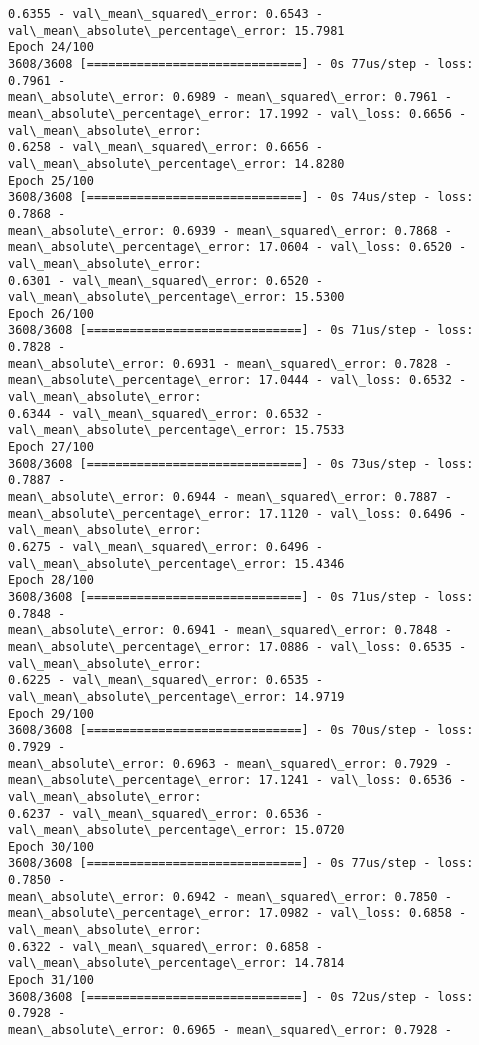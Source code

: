 \documentclass[11pt]{article}
\begin{document}
\begin{Verbatim}[commandchars=\\\{\},fontsize=\footnotesize]
0.6355 - val\_mean\_squared\_error: 0.6543 - val\_mean\_absolute\_percentage\_error: 15.7981
Epoch 24/100
3608/3608 [==============================] - 0s 77us/step - loss: 0.7961 -
mean\_absolute\_error: 0.6989 - mean\_squared\_error: 0.7961 -
mean\_absolute\_percentage\_error: 17.1992 - val\_loss: 0.6656 - val\_mean\_absolute\_error:
0.6258 - val\_mean\_squared\_error: 0.6656 - val\_mean\_absolute\_percentage\_error: 14.8280
Epoch 25/100
3608/3608 [==============================] - 0s 74us/step - loss: 0.7868 -
mean\_absolute\_error: 0.6939 - mean\_squared\_error: 0.7868 -
mean\_absolute\_percentage\_error: 17.0604 - val\_loss: 0.6520 - val\_mean\_absolute\_error:
0.6301 - val\_mean\_squared\_error: 0.6520 - val\_mean\_absolute\_percentage\_error: 15.5300
Epoch 26/100
3608/3608 [==============================] - 0s 71us/step - loss: 0.7828 -
mean\_absolute\_error: 0.6931 - mean\_squared\_error: 0.7828 -
mean\_absolute\_percentage\_error: 17.0444 - val\_loss: 0.6532 - val\_mean\_absolute\_error:
0.6344 - val\_mean\_squared\_error: 0.6532 - val\_mean\_absolute\_percentage\_error: 15.7533
Epoch 27/100
3608/3608 [==============================] - 0s 73us/step - loss: 0.7887 -
mean\_absolute\_error: 0.6944 - mean\_squared\_error: 0.7887 -
mean\_absolute\_percentage\_error: 17.1120 - val\_loss: 0.6496 - val\_mean\_absolute\_error:
0.6275 - val\_mean\_squared\_error: 0.6496 - val\_mean\_absolute\_percentage\_error: 15.4346
Epoch 28/100
3608/3608 [==============================] - 0s 71us/step - loss: 0.7848 -
mean\_absolute\_error: 0.6941 - mean\_squared\_error: 0.7848 -
mean\_absolute\_percentage\_error: 17.0886 - val\_loss: 0.6535 - val\_mean\_absolute\_error:
0.6225 - val\_mean\_squared\_error: 0.6535 - val\_mean\_absolute\_percentage\_error: 14.9719
Epoch 29/100
3608/3608 [==============================] - 0s 70us/step - loss: 0.7929 -
mean\_absolute\_error: 0.6963 - mean\_squared\_error: 0.7929 -
mean\_absolute\_percentage\_error: 17.1241 - val\_loss: 0.6536 - val\_mean\_absolute\_error:
0.6237 - val\_mean\_squared\_error: 0.6536 - val\_mean\_absolute\_percentage\_error: 15.0720
Epoch 30/100
3608/3608 [==============================] - 0s 77us/step - loss: 0.7850 -
mean\_absolute\_error: 0.6942 - mean\_squared\_error: 0.7850 -
mean\_absolute\_percentage\_error: 17.0982 - val\_loss: 0.6858 - val\_mean\_absolute\_error:
0.6322 - val\_mean\_squared\_error: 0.6858 - val\_mean\_absolute\_percentage\_error: 14.7814
Epoch 31/100
3608/3608 [==============================] - 0s 72us/step - loss: 0.7928 -
mean\_absolute\_error: 0.6965 - mean\_squared\_error: 0.7928 -

\end{Verbatim}
\end{document}
